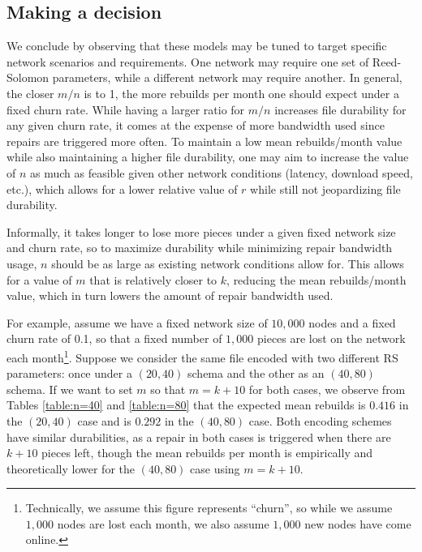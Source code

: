 \subsection{Making a decision}

We conclude by observing that these models may be tuned to target specific network scenarios and requirements. One network may require one set of Reed-Solomon parameters, while a different network may require another. In general, the closer $m/n$ is to 1, the more rebuilds per month one should expect under a fixed churn rate. While having a larger ratio for $m/n$ increases file durability for any given churn rate, it comes at the expense of more bandwidth used since repairs are triggered more often. To maintain a low mean rebuilds/month value while also maintaining a higher file durability, one may aim to increase the value of $n$ as much as feasible given other network conditions (latency, download speed, etc.), which allows for a lower relative value of $r$ while still not jeopardizing file durability. 

Informally, it takes longer to lose more pieces under a given fixed network size and churn rate, so to maximize durability while minimizing repair bandwidth usage, $n$ should be as large as existing network conditions allow for. This allows for a value of $m$ that is relatively closer to $k$, reducing the mean rebuilds/month value, which in turn lowers the amount of repair bandwidth used. 

For example, assume we have a fixed network size of $10,000$ nodes and a fixed churn rate of 0.1, so that a fixed number of $1,000$ pieces are lost on the network each month\footnote{
Technically, we assume this figure represents ``churn'', so while we assume $1,000$ nodes are lost each month, we also assume $1,000$ new nodes have come online.
}. 
Suppose we consider the same file encoded with two different RS parameters: 
once under a $(20,40)$ schema and the other as an $(40,80)$ schema. If we want 
to set $m$ so that $m=k+10$ for both cases, we observe from Tables 
\ref{table:n=40} and \ref{table:n=80} that the expected mean rebuilds is 
$0.416$ in the $(20,40)$ case and is $0.292$ in the $(40,80)$ case. Both 
encoding schemes have similar durabilities, as a repair in both cases is 
triggered when there are $k+10$ pieces left, though the mean rebuilds per month 
is empirically and theoretically lower for the $(40,80)$ case using $m=k+10$. 